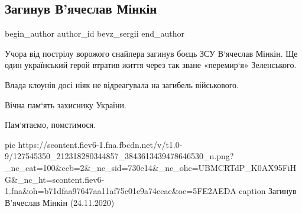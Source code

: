  
 
 
 
 
 
\subsection{Загинув В'ячеслав Мінкін}
\label{sec:25_11_2020.fb.bevz_sergii.1.minkin_death}
\ifcmt
	begin_author
   author_id bevz_sergii
	end_author
\fi
{}

Учора від пострілу ворожого снайпера загинув боєць ЗСУ В‘ячеслав Мінкін. Ще
один український герой втратив життя через так зване «перемир‘я» Зеленського.

Влада клоунів досі ніяк не відреагувала на загибель військового.

Вічна пам‘ять захиснику України.

Пам‘ятаємо, помстимося.

\ifcmt
pic https://scontent.fiev6-1.fna.fbcdn.net/v/t1.0-9/127545350_212318280344857_3843613439478646530_n.png?_nc_cat=100&ccb=2&_nc_sid=730e14&_nc_ohc=UBMCRTdP_K0AX95FiHG&_nc_ht=scontent.fiev6-1.fna&oh=b71dfaa97647aa11af75c01e9a74ceae&oe=5FE2AEDA
caption Загинув В'ячеслав Мінкін (24.11.2020)
\fi
